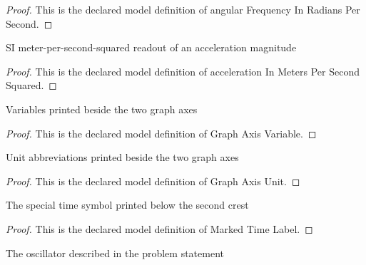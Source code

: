 \begin{proof}
  This is the declared model definition of angular Frequency In Radians Per Second.
\end{proof}
\begin{definition}
  \label{def:physics:phyx-mini-0273:phyxminiproblems-problemphyxmini0273-accelerationinmeterspersecondsquared}
  SI meter-per-second-squared readout of an acceleration magnitude
\end{definition}
\begin{proof}
  This is the declared model definition of acceleration In Meters Per Second Squared.
\end{proof}
\begin{definition}
  \label{def:physics:phyx-mini-0273:phyxminiproblems-problemphyxmini0273-graphaxisvariable}
  Variables printed beside the two graph axes
\end{definition}
\begin{proof}
  This is the declared model definition of Graph Axis Variable.
\end{proof}
\begin{definition}
  \label{def:physics:phyx-mini-0273:phyxminiproblems-problemphyxmini0273-graphaxisunit}
  Unit abbreviations printed beside the two graph axes
\end{definition}
\begin{proof}
  This is the declared model definition of Graph Axis Unit.
\end{proof}
\begin{definition}
  \label{def:physics:phyx-mini-0273:phyxminiproblems-problemphyxmini0273-markedtimelabel}
  The special time symbol printed below the second crest
\end{definition}
\begin{proof}
  This is the declared model definition of Marked Time Label.
\end{proof}
\begin{definition}
  \label{def:physics:phyx-mini-0273:phyxminiproblems-problemphyxmini0273-oscillatorkind}
  The oscillator described in the problem statement
\end{definition}
